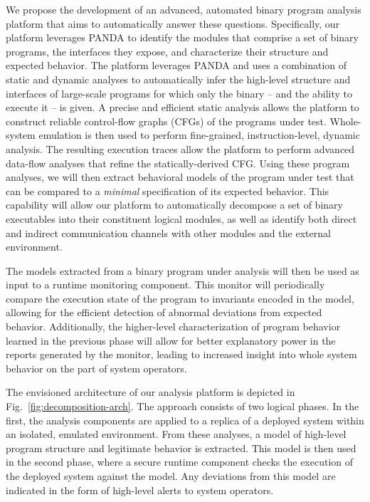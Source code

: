 \documentclass[letterpaper,twoside,11pt,headings=small]{scrartcl}
\newcommand{\dynamicsys}{\textsc{PANDA}\xspace}
\begin{document}
We propose the development of an advanced, automated binary program analysis
platform that aims to automatically answer these questions.  Specifically, our
platform leverages \dynamicsys to identify the modules that comprise a set of
binary programs, the interfaces they expose, and characterize their structure
and expected behavior.  The platform leverages \dynamicsys and uses a
combination of static and dynamic analyses to automatically infer the
high-level structure and interfaces of large-scale programs for which only the
binary -- and the ability to execute it -- is given.  A precise and efficient
static analysis allows the platform to construct reliable control-flow graphs
(CFGs) of the programs under test.  Whole-system emulation is then used to
perform fine-grained, instruction-level, dynamic analysis.  The resulting
execution traces allow the platform to perform advanced data-flow analyses
that refine the statically-derived CFG.  Using these program analyses, we will
then extract behavioral models of the program under test that can be compared
to a \emph{minimal} specification of its expected behavior.  This capability
will allow our platform to automatically decompose a set of binary executables
into their constituent logical modules, as well as identify both direct and
indirect communication channels with other modules and the external
environment.

The models extracted from a binary program under analysis will then be used as
input to a runtime monitoring component.  This monitor will periodically
compare the execution state of the program to invariants encoded in the model,
allowing for the efficient detection of abnormal deviations from expected
behavior.  Additionally, the higher-level characterization of program behavior
learned in the previous phase will allow for better explanatory power in the
reports generated by the monitor, leading to increased insight into whole
system behavior on the part of system operators.

The envisioned architecture of our analysis platform is depicted in
Fig.~\ref{fig:decomposition-arch}.  The approach consists of two logical
phases.  In the first, the analysis components are applied to a replica of a
deployed system within an isolated, emulated environment.  From these
analyses, a model of high-level program structure and legitimate behavior is
extracted.  This model is then used in the second phase, where a secure
runtime component checks the execution of the deployed system against the
model.  Any deviations from this model are indicated in the form of high-level
alerts to system operators.
\end{document}
